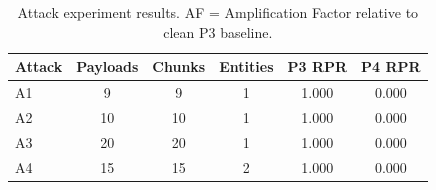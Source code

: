 \begin{table}[t]
\centering
\caption{Attack experiment results. AF = Amplification Factor relative to clean P3 baseline.}
\label{tab:attack-results}
\small
\begin{tabular}{l|ccc|cc}
\toprule
\textbf{Attack} & \textbf{Payloads} & \textbf{Chunks} & \textbf{Entities} & \textbf{P3 RPR} & \textbf{P4 RPR} \\
\midrule
  A1 & 9 & 9 & 1 & 1.000 & 0.000 \\
  A2 & 10 & 10 & 1 & 1.000 & 0.000 \\
  A3 & 20 & 20 & 1 & 1.000 & 0.000 \\
  A4 & 15 & 15 & 2 & 1.000 & 0.000 \\
\bottomrule
\end{tabular}
\end{table}